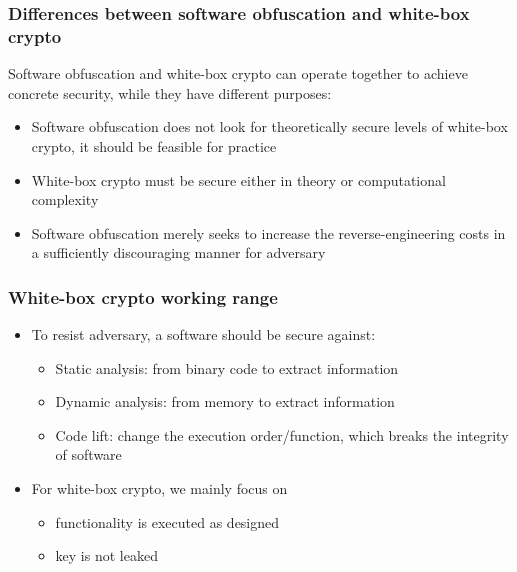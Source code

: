 \documentclass{beamer}
\begin{document}
\frame
{
\frametitle{Differences between software obfuscation and white-box crypto}
Software obfuscation and white-box crypto can operate together to achieve concrete security, while they have different purposes:
\begin{itemize}
\setlength{\itemsep}{12pt}
\item Software obfuscation does not look for theoretically secure levels of white-box crypto, it should be feasible for practice

\item White-box crypto must be secure either in theory or computational complexity

\item Software obfuscation merely seeks to increase the reverse-engineering costs in a sufficiently discouraging manner for adversary
\end{itemize}

}

\frame
{
\frametitle{White-box crypto working range}
\begin{itemize}
\setlength{\itemsep}{12pt}
\item To resist adversary, a software should be secure against:
\begin{itemize}
\setlength{\itemsep}{12pt}
\item Static analysis: from binary code to extract information

\item Dynamic analysis: from memory to extract information

\item Code lift: change the execution order/function, which breaks the integrity of software
\end{itemize}

\item For white-box crypto, we mainly focus on
\begin{itemize}
\setlength{\itemsep}{12pt}
\item functionality is executed as designed

\item key is not leaked
\end{itemize}

\end{itemize}

}
\end{document}
